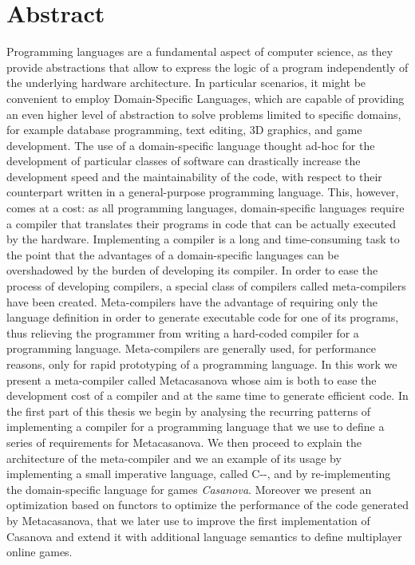 \chapter*{Abstract}
\thispagestyle{empty}
Programming languages are a fundamental aspect of computer science, as they provide abstractions that allow to express the logic of a program independently of the underlying hardware architecture. In particular scenarios, it might be convenient to employ Domain-Specific Languages, which are capable of providing an even higher level of abstraction to solve problems limited to specific domains, for example database programming, text editing, 3D graphics, and game development. The use of a domain-specific language thought ad-hoc for the development of particular classes of software can drastically increase the development speed and the maintainability of the code, with respect to their counterpart written in a general-purpose programming language. This, however, comes at a cost: as all programming languages, domain-specific languages require a compiler that translates their programs in code that can be actually executed by the hardware. Implementing a compiler is a long and time-consuming task to the point that the advantages of a domain-specific languages can be overshadowed by the burden of developing its compiler. In order to ease the process of developing compilers, a special class of compilers called meta-compilers have been created. Meta-compilers have the advantage of requiring only the language definition in order to generate executable code for one of its programs, thus relieving the programmer from writing a hard-coded compiler for a programming language. Meta-compilers are generally used, for performance reasons, only for rapid prototyping of a programming language. In this work we present a meta-compiler called Metacasanova whose aim is both to ease the development cost of a compiler and at the same time to generate efficient code. In the first part of this thesis we begin by analysing the recurring patterns of implementing a compiler for a programming language that we use to define a series of requirements for Metacasanova. We then proceed to explain the architecture of the meta-compiler and we an example of its usage by implementing a small imperative language, called C-{}-, and by re-implementing the domain-specific language for games \textit{Casanova}. Moreover we present an optimization based on functors to optimize the performance of the code generated by Metacasanova, that we later use to improve the first implementation of Casanova and extend it with additional language semantics to define multiplayer online games.